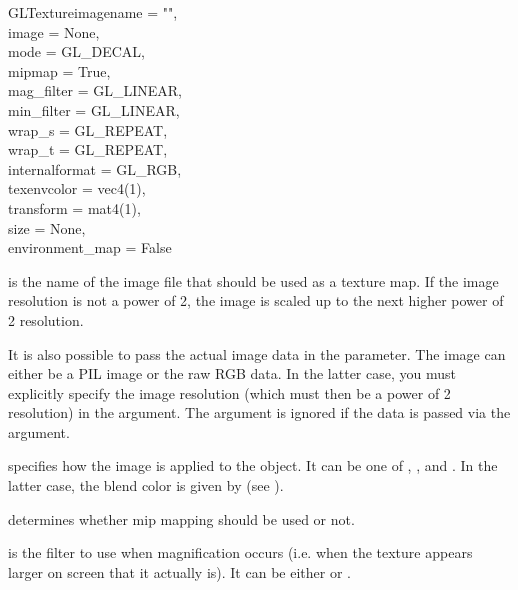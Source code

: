 \begin{classdesc}{GLTexture}{imagename = "",\\
                             image = None,\\ 
                             mode = GL_DECAL,\\
                             mipmap = True,\\
                             mag_filter = GL_LINEAR,\\
                             min_filter = GL_LINEAR,\\
                             wrap_s = GL_REPEAT,\\
                             wrap_t = GL_REPEAT,\\
                             internalformat = GL_RGB,\\
                             texenvcolor = vec4(1),\\
                             transform = mat4(1),\\
                             size = None, \\
                             environment_map = False\\
                            }

 is the name of the image file that should be used as a
texture map. If the image resolution is not a power of 2, the image
is scaled up to the next higher power of 2 resolution.

It is also possible to pass the actual image data in the 
parameter.  The image can either be a PIL image or the raw RGB
data. In the latter case, you must explicitly specify the image
resolution (which must then be a power of 2 resolution) in the 
argument. The  argument is ignored if the data is passed
via the  argument.

 specifies how the image is applied to the object. It can be
one of , ,  and 
. In the latter
case, the blend color is given by  
(see ).

 determines whether mip mapping should be used or not.

 is the filter to use when magnification occurs (i.e. when
the texture appears larger on screen that it actually is). It can be
either  or .


\end{classdesc}
